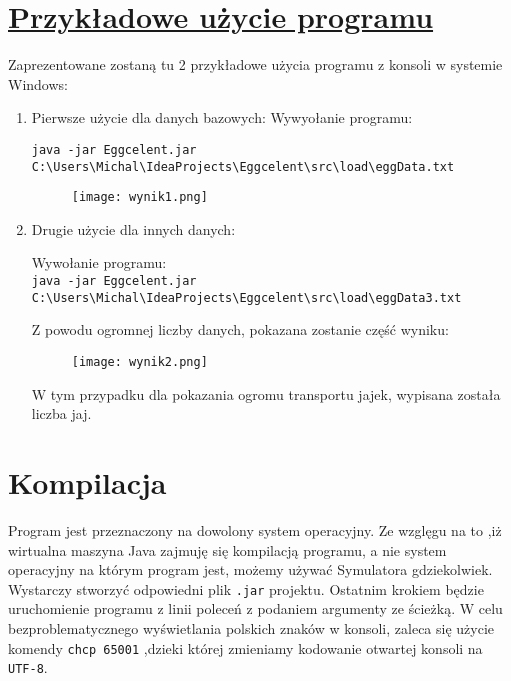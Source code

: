 \documentclass{article}
\begin{document}
\section{\underline{Przykładowe użycie programu}}
\indent Zaprezentowane zostaną tu 2 przykładowe użycia programu z konsoli w systemie Windows:
\begin{enumerate}
	\item Pierwsze użycie dla danych bazowych:
Wywyołanie programu:

\verb|java -jar Eggcelent.jar C:\Users\Michal\IdeaProjects\Eggcelent\src\load\eggData.txt|


\begin{figure}[h]
\hspace*{-2.8cm} 
\texttt{[image: wynik1.png]}
\end{figure}
\newpage
\item Drugie użycie dla innych danych:

Wywołanie programu:\\
\verb|java -jar Eggcelent.jar C:\Users\Michal\IdeaProjects\Eggcelent\src\load\eggData3.txt|

Z powodu ogromnej liczby danych, pokazana zostanie część wyniku:
\begin{figure}[h]
\hspace*{2.4cm} 
\texttt{[image: wynik2.png]}
\end{figure}

W tym przypadku dla pokazania ogromu transportu jajek, wypisana została liczba jaj.
\end{enumerate}
\section{Kompilacja}
Program jest przeznaczony na dowolony system operacyjny. Ze wzglęgu na to ,iż wirtualna maszyna Java zajmuję się kompilacją programu, a nie system operacyjny na którym program jest, możemy używać Symulatora gdziekolwiek. Wystarczy stworzyć odpowiedni plik \verb |.jar| projektu. Ostatnim krokiem będzie uruchomienie programu z linii poleceń z podaniem argumenty ze ścieżką. W celu bezproblematycznego wyświetlania polskich znaków w konsoli, zaleca się użycie komendy \verb|chcp 65001| ,dzieki której zmieniamy kodowanie otwartej konsoli na \verb|UTF-8|.
\end{document}
